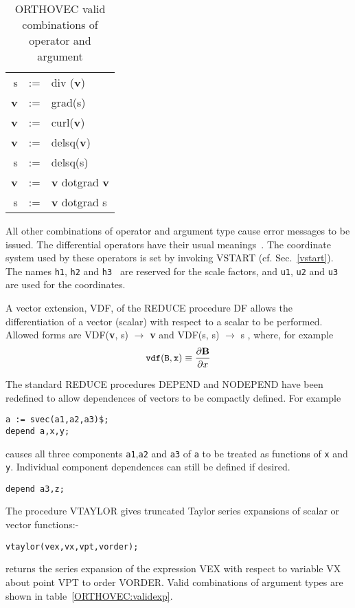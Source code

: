 \begin{table}
\begin{center}
\begin{tabular}{rcl}
s & := & div ({\bf v})  \\
{\bf v} & := & grad(s) \\
{\bf v} & := & curl({\bf v})  \\
{\bf v} & := & delsq({\bf v}) \\
 s  & := & delsq(s) \\
{\bf v} & := & {\bf v}  dotgrad {\bf v}  \\
 s & := & {\bf v}  dotgrad  s 
\end{tabular}
\end{center}
\caption{ORTHOVEC valid combinations of operator and argument}\label{vvecttable}
\end{table}

All other combinations of operator and argument type cause error
messages to be issued.  The differential operators have their usual
meanings~\cite{Speigel:59}.  The coordinate system used by these operators is
set by invoking  VSTART (cf. Sec.~\ref{vstart}).  The names {\tt h1}, 
{\tt h2}  and {\tt h3 } are
reserved for the scale factors, and {\tt u1}, {\tt u2} and {\tt u3} are 
used for the coordinates.

A vector extension, VDF, of the REDUCE procedure DF allows the 
differentiation of a vector (scalar) with respect to a scalar to be
performed.  Allowed forms are 
VDF({\bf v}, s)  $\rightarrow$  {\bf v}   and
VDF(s, s)  $\rightarrow$   s , 
where, for example\\
\begin{eqnarray*}
{\tt vdf( B,x)} \equiv \frac{\partial {\bf B}}{\partial x}
\end{eqnarray*}

The standard REDUCE procedures DEPEND and NODEPEND have been redefined
to allow dependences of vectors to be compactly
defined.  For example  
\begin{verbatim}
a := svec(a1,a2,a3)$;
depend a,x,y;
\end{verbatim}
causes all three components {\tt a1},{\tt a2} and {\tt a3} of {\tt a} 
to be treated as functions of {\tt x} and {\tt y}.
Individual component dependences can still be defined if desired.
\begin{verbatim}
depend a3,z;
\end{verbatim}

The procedure VTAYLOR gives truncated Taylor series expansions of scalar
or vector functions:- 
\begin{verbatim}
vtaylor(vex,vx,vpt,vorder);
\end{verbatim}
returns the series expansion of the expression 
VEX  with respect to variable VX 
about point VPT  to order VORDER.  Valid
combinations of argument types are shown in table~\ref{ORTHOVEC:validexp}. \\

